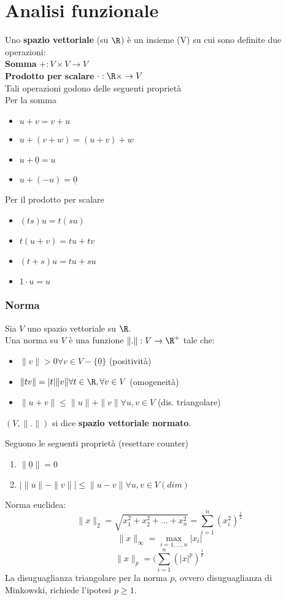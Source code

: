 

\section{Analisi funzionale}
Uno \textbf{spazio vettoriale} (su $\R$) è un insieme (V) su cui sono definite due operazioni:
\\\textbf{Somma} $+:V \times V\to V$
\\\textbf{Prodotto per scalare} $\cdot :\R \times \to V$
\\Tali operazioni godono delle seguenti proprietà
\\Per la somma
\begin{itemize}
	\item $u+v=v+u$ 
	\item $u+(v+w)=(u+v)+w$
	\item $u+\underline 0=u$
	\item $u+(-u)=\underline 0$
\end{itemize}
Per il prodotto per scalare
\begin{itemize}
	\item $(ts)u=t(su)$
	\item $t(u+v)=tu+tv$
	\item $(t+s)u=tu+su$
	\item $1\cdot u=u$
\end{itemize}
\subsubsection{Norma}
\begin{tcolorbox}
	Sia $V$ uno spazio vettoriale su $\R$.
	\\Una norma su $V$ è una funzione $\|.\|:V\to \R^+$ tale che:
	\begin{itemize}
		\item $\|v\|>0\forall v\in V-\{\underline 0\} $ (positività)
		\item $\|tv\|=|t|\|v\|\forall t\in\R,\forall v\in V$ (omogeneità)
		\item $\|u+v\|\le \|u\|+\|v\|\forall u,v\in V$ (dis. triangolare)
	\end{itemize}
\end{tcolorbox}
\begin{tcolorbox}
	$(V,\|.\|)$ si dice \textbf{spazio vettoriale normato}.
\end{tcolorbox}
Seguono le seguenti proprietà (resettare counter)
\begin{enumerate}
	\item $\|\underline 0\|=0$
	\item $| \|u\|-\|v\| |\le \|u-v\|\forall u,v\in V (dim)$
\end{enumerate}
Norma euclidea:
\[\|x\|_2=\sqrt{x_1^2+x_2^2+\ldots+x_n^2} =\sum_{i=1}^{n} (x_i^2)^\frac{1}{2}\]
\[\|x\|_\infty=\max_{i=1,\ldots,n}|x_i|\]
\[\|x\|_p=(\sum_{i=1}^{n}(|x|^p)^{\frac{1}{p}}\]
La disuguaglianza triangolare per la norma $p$, ovvero disuguaglianza di Minkowski, richiede l'ipotesi $p\ge 1$.
